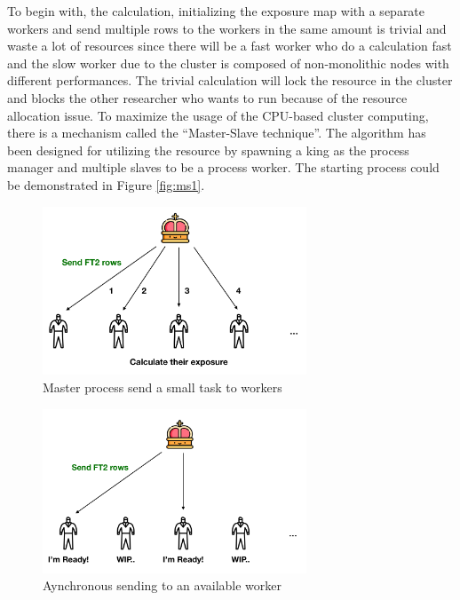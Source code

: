 To begin with, the calculation, initializing the exposure map with a 
separate workers and send multiple rows to the workers in the same amount
is trivial and waste a lot of resources since there will be a fast worker 
who do a calculation fast and the slow worker due to the cluster 
is composed of non-monolithic nodes with different performances.
The trivial calculation will lock the resource in the cluster and blocks 
the other researcher who wants to run because of the resource allocation issue.
To maximize the usage of the CPU-based cluster computing, there is a 
mechanism called the ``Master-Slave technique''. The algorithm has been designed for utilizing the resource by spawning a king as the process manager 
and multiple slaves to be a process worker. The starting process could 
be demonstrated in Figure \ref{fig:ms1}. 


\begin{figure}[h!]
    \centering
    \includegraphics[width=0.7\textwidth]{content/methodology/figures/ms2}
    \caption{Master process send a small task to workers}
    \label{fig:ms2}
\end{figure}


\begin{figure}[h!]
    \centering
    \includegraphics[width=0.7\textwidth]{content/methodology/figures/ms3}
    \caption{Aynchronous sending to an available worker}
    \label{fig:ms3}
\end{figure}


